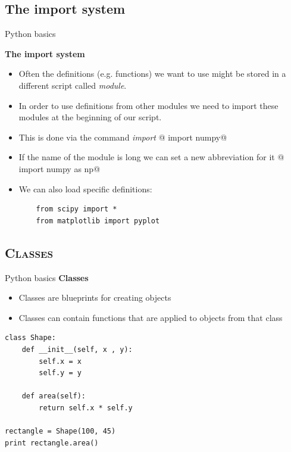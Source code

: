 \documentclass[xcolor=x11names, compress,handout]{beamer}
\renewcommand{\(}{\begin{columns}}
\renewcommand{\)}{\end{columns}}
\newcommand{\<}[1]{\begin{column}{#1}}
\renewcommand{\>}{\end{column}}
\begin{document}
\subsection{The import system}
\begin{frame}[fragile]{Python basics}

\textbf{The import system}

\begin{itemize}
	\item Often the definitions (e.g. functions) we want to use might be stored in a different script called \textit{module}.
	\item In order to use definitions from other modules we need to import these modules at the beginning of our script.
	\item This is done via the command \textit{import} 
  @    import numpy@
	\item If the name of the module is long we can set a new abbreviation for it
  @    import numpy as np@
	\item We can also load specific definitions:
  \begin{verbatim}
    from scipy import *
    from matplotlib import pyplot
  \end{verbatim}
\end{itemize}

\end{frame}


\subsection{\scshape Classes}
\begin{frame}[fragile]{Python basics}
\textbf{Classes}
\begin{itemize}
\item Classes are blueprints for creating objects
\item Classes can contain functions that are applied to objects from that class
\end{itemize}

\begin{verbatim}
class Shape:
    def __init__(self, x , y):
        self.x = x
        self.y = y

    def area(self):
        return self.x * self.y

rectangle = Shape(100, 45)
print rectangle.area()
\end{verbatim}

\end{frame}
\end{document}
